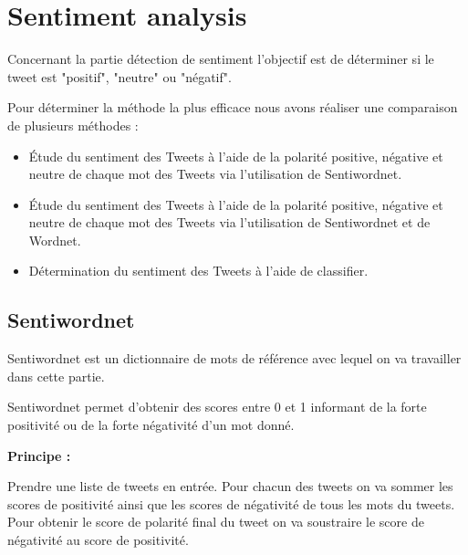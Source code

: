 \section{Sentiment analysis}

\par Concernant la partie détection de sentiment l'objectif est de déterminer si le tweet est "positif", "neutre" ou "négatif". 
\par Pour déterminer la méthode la plus efficace nous avons réaliser une comparaison de plusieurs méthodes :

\begin{itemize}
	\item Étude du sentiment des Tweets à l'aide de la polarité positive, négative et neutre de chaque mot des Tweets via l'utilisation de Sentiwordnet.
	\item Étude du sentiment des Tweets à l'aide de la polarité positive, négative et neutre de chaque mot des Tweets via l'utilisation de Sentiwordnet et de Wordnet.
	\item Détermination du sentiment des Tweets à l'aide de classifier.
\end{itemize}

\subsection{Sentiwordnet}
\par Sentiwordnet est un dictionnaire de mots de référence avec lequel on va travailler dans cette partie.
\par Sentiwordnet permet d'obtenir des scores entre 0 et 1 informant de la forte positivité ou de la forte négativité d'un mot donné. \\


\par \textbf{Principe :} \\
\par Prendre une liste de tweets en entrée. Pour chacun des tweets on va sommer les scores de positivité ainsi que les scores de négativité de tous les mots du tweets. Pour obtenir le score de polarité final du tweet on va soustraire le score de négativité au score de positivité. \\

